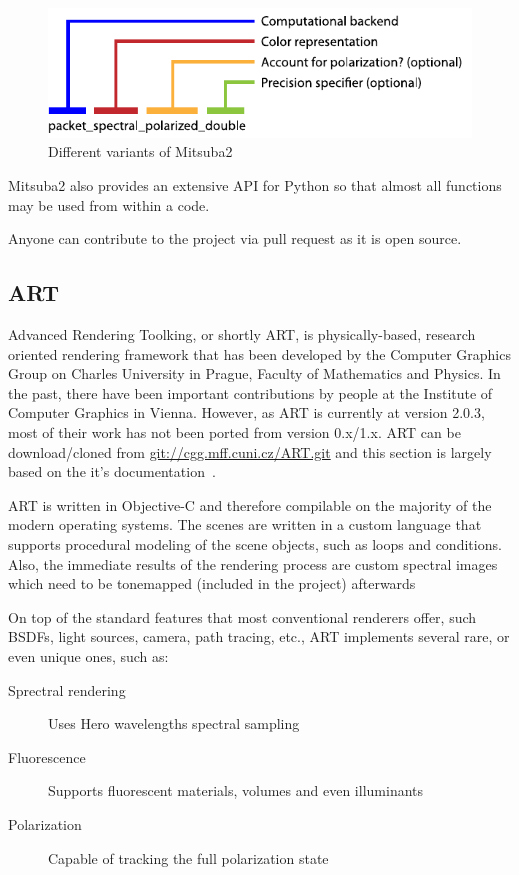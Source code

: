 \begin{figure}
	\centering
	\includegraphics[width=0.8\linewidth]{img/mitsuba_variants.pdf}
	\caption{Different variants of Mitsuba2}
	\label{fig:mitsuba_variations}
\end{figure}

Mitsuba2 also provides an extensive API for Python so that almost all functions may be used from within a code. 

Anyone can contribute to the project via pull request as it is open source.

\subsection{ART}

Advanced Rendering Toolking, or shortly ART, is physically-based, research oriented rendering framework that has been developed by the Computer Graphics Group on Charles University in Prague, Faculty of Mathematics and Physics. In the past, there have been important contributions by people at the Institute of Computer Graphics in Vienna. However, as ART is currently at version 2.0.3, most of their work has not been ported from version 0.x/1.x. ART can be download/cloned from \url{git://cgg.mff.cuni.cz/ART.git} and this section is largely based on the it's documentation~\cite{artDoc}.

ART is written in Objective-C and therefore compilable on the majority of the modern operating systems. The scenes are written in a custom language that supports procedural modeling of the scene objects, such as loops and conditions. Also, the immediate results of the rendering process are custom spectral images which need to be tonemapped (included in the project) afterwards

On top of the standard features that most conventional renderers offer, such BSDFs, light sources, camera, path tracing, etc., ART implements several rare, or even unique ones, such as:

\begin{description}
	\item[Sprectral rendering] Uses Hero wavelengths spectral sampling
	\item[Fluorescence] Supports fluorescent materials, volumes and even illuminants
	\item[Polarization] Capable of tracking the full polarization state
\end{description}

